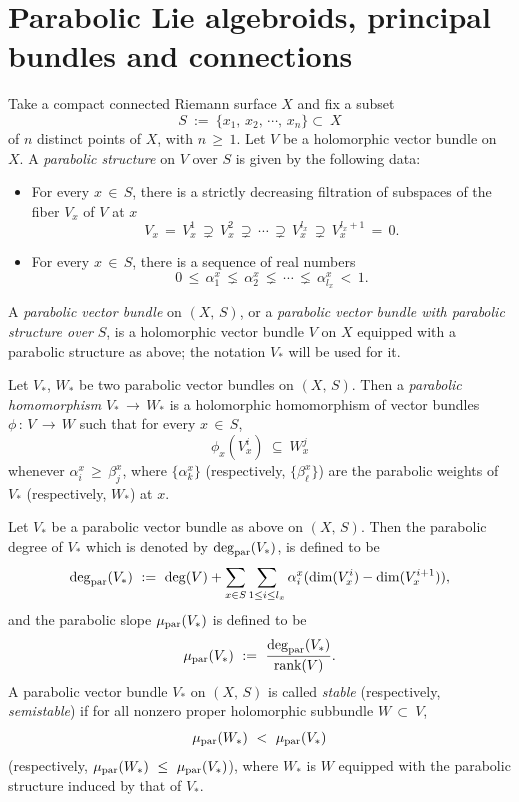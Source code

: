 \documentclass[12pt, reqno]{amsart}
\numberwithin{equation}{section}
\newcommand{\rank}{\textrm{rank}}
\begin{document}
\section{Parabolic Lie algebroids, principal bundles and connections}\label{third}
Take a compact connected Riemann surface $X$ and fix a subset
$$S\ :=\ \{x_{1},\,x_{2},\,\cdots ,\, x_{n}\} \subset\ X$$
of $n$ distinct points of $X$, with $n\,\geq\, 1$. Let $V$ be a holomorphic vector bundle on $X$. A
{\it parabolic structure} on $V$ over $S$ is given by the following data:
\begin{itemize}
\item For every $x\,\in\, S$, there is a strictly decreasing filtration of subspaces of the fiber $V_x$ of
$V$ at $x$
\[V_{x}\,=\,V^{1}_{x}\,\supsetneq\, V^{2}_{x}\,\supsetneq\,\cdots\,
\supsetneq\, V^{l_{x}}_{x}\,\supsetneq\, V^{l_{x}+1}_{x}\,=\,0.\]
 
\item For every $x\,\in\, S$, there is a sequence of real numbers
\[0\,\leq\, \alpha^{x}_{1}\,\lneq\, \alpha^{x}_{2}\,\lneq\,\cdots\, \lneq\, \alpha^{x}_{l_{x}}\,<\,1.\]
\end{itemize}

A {\it parabolic vector bundle} on $(X,\,S)$, or a {\it parabolic vector bundle with parabolic structure over} 
$S$, is a holomorphic vector bundle $V$ on $X$ equipped with a parabolic structure as above; the notation $V_*$ 
will be used for it.

Let $V_*$, $W_*$ be two parabolic vector bundles on $(X,\,S)$. Then a {\it parabolic homomorphism}
$V_*\, \longrightarrow\, W_*$ is a holomorphic homomorphism of vector bundles
$\phi\,:\,V\,\longrightarrow\, W$ such that for every $x\,\in\, S$,
$$\phi_{x}(V^{i}_{x})\ \subseteq\ W^{j}_{x}$$ whenever $\alpha^{x}_{i}\,\geq\,\beta^{x}_{j}$, where
$\{\alpha^{x}_{k}\}$ (respectively, $\{\beta^{x}_{\ell}\}$) are the parabolic weights
of $V_*$ (respectively, $W_*$) at $x$.

Let $V_*$ be a parabolic vector bundle as above on $(X,\,S)$. Then the parabolic degree of $V_*$ which is
denoted by $\deg_{\rm par}(V_*)$, is defined to be
$$
\deg_{\rm par}(V_*)\ :=\ \deg(V)+\sum_{x\in S}\sum_{1\leq i\leq l_{x}}\alpha^{x}_{i}(\dim(V^{i}_{x})-
\dim(V^{i+1}_{x})),
$$
and the parabolic slope $\mu_{\rm par}(V_*)$ is defined to be 
$$
\mu_{\rm par}(V_*)\ :=\ \frac{\deg_{\rm par}(V_*)}{\rank(V)}.
$$
A parabolic vector bundle $V_*$ on $(X,\, S)$ is called {\it stable} (respectively,
{\it semistable}) if for all nonzero proper holomorphic subbundle $W\, \subset\ V$,
$$\mu_{\rm par}(W_*)\ <\ \mu_{\rm par}(V_*)$$
(respectively, $\mu_{\rm par}(W_*)\ \leq\ \mu_{\rm par}(V_*)$), where
$W_*$ is $W$ equipped with the parabolic structure induced by that of $V_*$.
\end{document}
